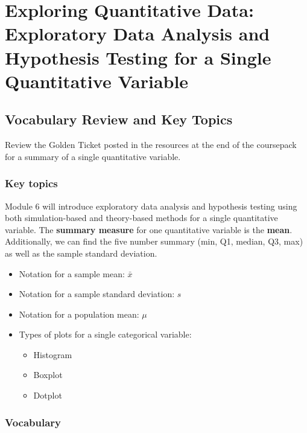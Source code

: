 \documentclass[
]{report}
\begin{document}
\nocite{*}

\chapter{Exploring Quantitative Data: Exploratory Data Analysis and Hypothesis Testing for a Single Quantitative Variable}\label{exploring-quantitative-data-exploratory-data-analysis-and-hypothesis-testing-for-a-single-quantitative-variable}

\section{Vocabulary Review and Key Topics}\label{vocabulary-review-and-key-topics}

Review the Golden Ticket posted in the resources at the end of the coursepack for a summary of a single quantitative variable.

\subsection{Key topics}\label{key-topics}

Module 6 will introduce exploratory data analysis and hypothesis testing using both simulation-based and theory-based methods for a single quantitative variable.
The \textbf{summary measure} for one quantitative variable is the \textbf{mean}.
Additionally, we can find the five number summary (min, Q1, median, Q3, max) as well as the sample standard deviation.

\begin{itemize}
\item
  Notation for a sample mean: \(\bar{x}\)
\item
  Notation for a sample standard deviation: \(s\)
\item
  Notation for a population mean: \(\mu\)
\item
  Types of plots for a single categorical variable:

  \begin{itemize}
  \item
    Histogram
  \item
    Boxplot
  \item
    Dotplot
  \end{itemize}
\end{itemize}

\subsection{Vocabulary}\label{vocabulary}
\end{document}
